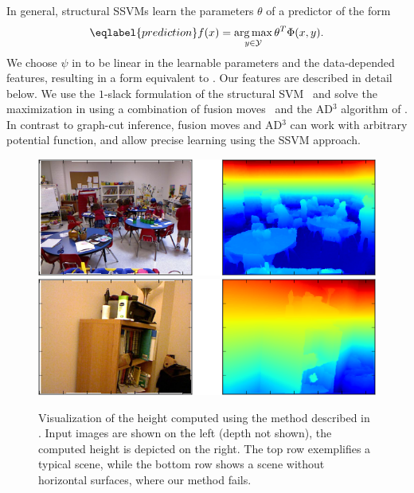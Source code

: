 \documentclass[a4paper, 10pt, conference]{ieeeconf}      %
\DeclareMathOperator*{\argmax}{arg\,max}
\begin{document}
In general, structural SSVMs learn the parameters $\theta$ of a predictor of the form
\begin{equation}\eqlabel{prediction}
f(x) = \argmax_{y \in \mathcal{Y}} \theta^T \Phi(x, y).
\end{equation}
We choose $\psi$ in  to be linear in the learnable parameters and
the data-depended features, resulting in a form equivalent to
. Our features are described in detail below.  We use the
$1$-slack formulation of the structural SVM~\citep{joachims2009cutting} and
solve the maximization in  using a combination of fusion
moves~\citep{lempitsky2010fusion} and the AD$^3$ algorithm of
\citet{martins2011augmented}.  In contrast to graph-cut inference, fusion moves
and AD$^3$ can work with arbitrary potential function, and allow precise
learning using the SSVM approach.

\begin{figure}
    \begin{center}
        \includegraphics[width=\linewidth]{images/height_success}\\
        \vspace{3mm}
        \includegraphics[width=\linewidth]{images/height_failure}
    \end{center}
    \caption{%
        Visualization of the height computed using the method described in .
        Input images are shown on the left (depth not shown), the computed height is depicted on the right.
        The top row exemplifies a typical scene, while the bottom row shows a scene without horizontal
        surfaces, where our method fails.
    }
\end{figure}
\end{document}
